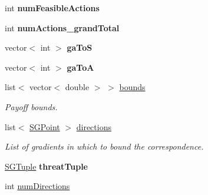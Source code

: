\begin{DoxyCompactItemize}
\item 
\mbox{\label{classSGSolver__MaxMinMax__GRB_a74172d7ebc68670f23118fd42c0dba4a}} 
int {\bfseries num\+Feasible\+Actions}
\item 
\mbox{\label{classSGSolver__MaxMinMax__GRB_a00d68f1980b5aeb9c09e514005f7fee3}} 
int {\bfseries num\+Actions\+\_\+grand\+Total}
\item 
\mbox{\label{classSGSolver__MaxMinMax__GRB_a5bbc0ff6e2848e6f5b421b892dbb7587}} 
vector$<$ int $>$ {\bfseries ga\+ToS}
\item 
\mbox{\label{classSGSolver__MaxMinMax__GRB_aa53a05bbda9134e16ef32c0fa1ec2520}} 
vector$<$ int $>$ {\bfseries ga\+ToA}
\item 
\mbox{\label{classSGSolver__MaxMinMax__GRB_a81fef4ee08dc58f5281bb7e42da717df}} 
list$<$ vector$<$ double $>$ $>$ \hyperlink{classSGSolver__MaxMinMax__GRB_a81fef4ee08dc58f5281bb7e42da717df}{bounds}
\begin{DoxyCompactList}\small\item\em Payoff bounds. \end{DoxyCompactList}\item 
\mbox{\label{classSGSolver__MaxMinMax__GRB_a9f3d30641de444fced77a47227b019b3}} 
list$<$ \hyperlink{classSGPoint}{S\+G\+Point} $>$ \hyperlink{classSGSolver__MaxMinMax__GRB_a9f3d30641de444fced77a47227b019b3}{directions}
\begin{DoxyCompactList}\small\item\em List of gradients in which to bound the correspondence. \end{DoxyCompactList}\item 
\mbox{\label{classSGSolver__MaxMinMax__GRB_ac7b0a808eaa13b835702ab4255697473}} 
\hyperlink{classSGTuple}{S\+G\+Tuple} {\bfseries threat\+Tuple}
\item 
\mbox{\label{classSGSolver__MaxMinMax__GRB_a70deb0251347be75832bc2965ecf5088}} 
int \hyperlink{classSGSolver__MaxMinMax__GRB_a70deb0251347be75832bc2965ecf5088}{num\+Directions}

\end{DoxyCompactItemize}
